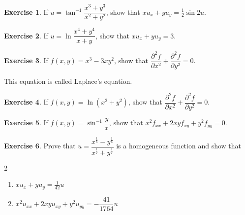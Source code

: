 \documentclass[../../main.tex]{subfiles}
\theoremstyle{definition}
\newtheorem{exercise}{Exercise}[section]
\begin{document}
\begin{exercise}
If $u=\tan^{-1}\dfrac{x^3+y^3}{x^2+y^2}$, show that $xu_x+yu_y=\frac{1}{2}\sin 2u$.    
\end{exercise}

\begin{exercise}
If $u=\ln\dfrac{x^4+y^4}{x+y}$, show that $xu_x+yu_y=3$.    
\end{exercise}

\begin{exercise}
If $f(x,y)=x^3-3xy^2$, show that $\dfrac{\partial^2f}{\partial x^2}+\dfrac{\partial^2f}{\partial y^2}=0$.

This equation is called Laplace's equation.
\end{exercise}

\begin{exercise}
If $f(x,y)=\ln(x^2+y^2)$, show that $\dfrac{\partial^2f}{\partial x^2}+\dfrac{\partial^2f}{\partial y^2}=0$.    
\end{exercise}

\begin{exercise}
If $f(x,y)=\sin^{-1}\dfrac{y}{x}$, show that $x^2f_{xx}+2xyf_{xy}+y^2f_{yy}=0$.
\end{exercise}

\begin{exercise}
Prove that $u=\dfrac{x^{\frac{1}{6}}-y^{\frac{1}{6}}}{x^{\frac{1}{7}}+y^{\frac{1}{7}}}$ is a homogeneous function and show that
\begin{multicols}{2}
\begin{enumerate}[label=(\roman*)]
    \item $xu_x+yu_y=\frac{1}{42}u$
    \item $x^2u_{xx}+2xyu_{xy}+y^2u_{yy}=-\dfrac{41}{1764}u$

\end{enumerate}
\end{multicols}
\end{exercise}









    
\end{document}
